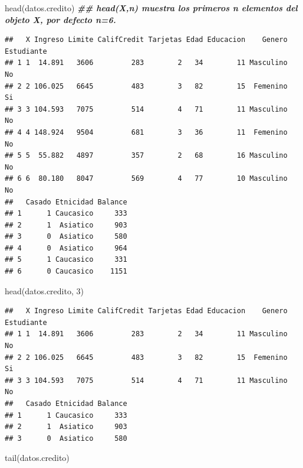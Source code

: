 \documentclass[
  12pt,
]{book}
\newenvironment{Shaded}{\begin{snugshade}}{\end{snugshade}}
\newcommand{\DecValTok}[1]{\textcolor[rgb]{0.00,0.00,0.81}{#1}}
\newcommand{\DocumentationTok}[1]{\textcolor[rgb]{0.56,0.35,0.01}{\textbf{\textit{#1}}}}
\newcommand{\FunctionTok}[1]{\textcolor[rgb]{0.00,0.00,0.00}{#1}}
\newcommand{\NormalTok}[1]{#1}
\begin{document}
\begin{Shaded}
\begin{Highlighting}[]
\FunctionTok{head}\NormalTok{(datos.credito) }\DocumentationTok{\#\# head(X,n) muestra los primeros n elementos del objeto X, por defecto n=6.}
\end{Highlighting}
\end{Shaded}

\begin{verbatim}
##   X Ingreso Limite CalifCredit Tarjetas Edad Educacion    Genero Estudiante
## 1 1  14.891   3606         283        2   34        11 Masculino         No
## 2 2 106.025   6645         483        3   82        15  Femenino         Si
## 3 3 104.593   7075         514        4   71        11 Masculino         No
## 4 4 148.924   9504         681        3   36        11  Femenino         No
## 5 5  55.882   4897         357        2   68        16 Masculino         No
## 6 6  80.180   8047         569        4   77        10 Masculino         No
##   Casado Etnicidad Balance
## 1      1 Caucasico     333
## 2      1  Asiatico     903
## 3      0  Asiatico     580
## 4      0  Asiatico     964
## 5      1 Caucasico     331
## 6      0 Caucasico    1151
\end{verbatim}

\begin{Shaded}
\begin{Highlighting}[]
\FunctionTok{head}\NormalTok{(datos.credito, }\DecValTok{3}\NormalTok{)}
\end{Highlighting}
\end{Shaded}

\begin{verbatim}
##   X Ingreso Limite CalifCredit Tarjetas Edad Educacion    Genero Estudiante
## 1 1  14.891   3606         283        2   34        11 Masculino         No
## 2 2 106.025   6645         483        3   82        15  Femenino         Si
## 3 3 104.593   7075         514        4   71        11 Masculino         No
##   Casado Etnicidad Balance
## 1      1 Caucasico     333
## 2      1  Asiatico     903
## 3      0  Asiatico     580
\end{verbatim}

\begin{Shaded}
\begin{Highlighting}[]
\FunctionTok{tail}\NormalTok{(datos.credito)}
\end{Highlighting}
\end{Shaded}
\end{document}

